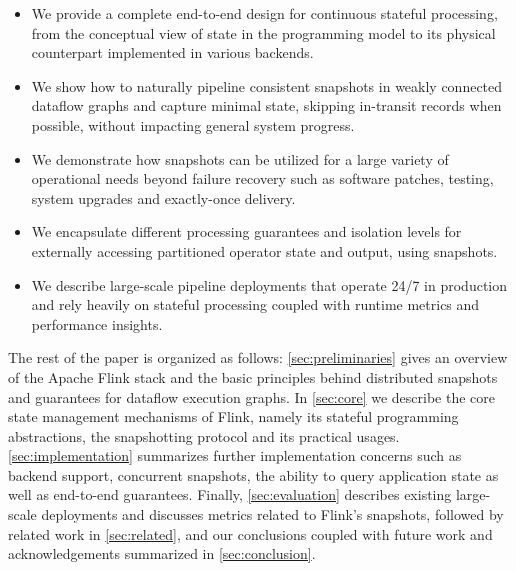 \begin{itemize}
	\item We provide a complete end-to-end design for continuous stateful processing, from the conceptual view of state in the programming model to its physical counterpart implemented in various backends.
	\item We show how to naturally pipeline consistent snapshots in weakly connected dataflow graphs and capture minimal state, skipping in-transit records when possible, without impacting general system progress.
	\item We demonstrate how snapshots can be utilized for a large variety of operational needs beyond failure recovery such as software patches, testing, system upgrades and exactly-once delivery.
	\item We encapsulate different processing guarantees and isolation levels for externally accessing partitioned operator state and output, using snapshots.
	\item We describe  large-scale pipeline  deployments that operate 24/7 in production and rely heavily on stateful processing coupled with runtime metrics and performance insights.
\end{itemize}

The rest of the paper is organized as follows: \autoref{sec:preliminaries} gives an overview of the Apache Flink stack and the basic principles behind distributed snapshots and guarantees for dataflow execution graphs. In \autoref{sec:core} we describe the core state management mechanisms of Flink, namely its stateful programming abstractions, the snapshotting protocol and its practical usages. \autoref{sec:implementation} summarizes further implementation concerns such as backend support, concurrent snapshots, the ability to query application state as well as end-to-end guarantees. Finally, \autoref{sec:evaluation} describes existing large-scale deployments and discusses metrics related to Flink's snapshots, followed by related work in \autoref{sec:related}, and our conclusions coupled with future work and acknowledgements summarized in \autoref{sec:conclusion}. 
